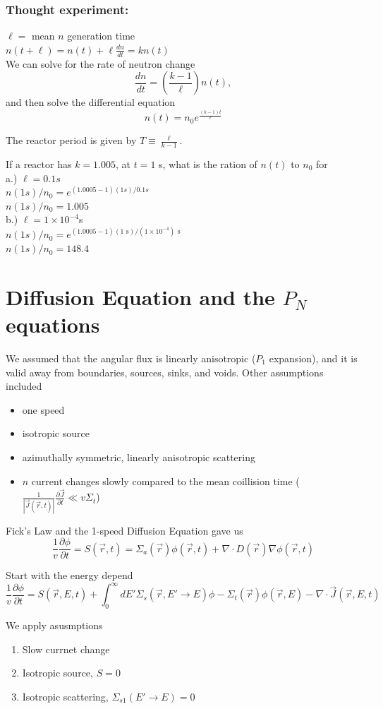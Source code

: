 \documentclass{report}
\newcommand{\tab}{\-\hspace{1cm}}
\newcommand{\h}[1]{\section*{#1}}
\newcommand{\hhh}[1]{\subsubsection*{#1}}
\newcommand{\p}{\partial}
\newcommand{\Xs}{\Sigma}
\newcommand{\Oov}{\frac{1}{v}}
\newcommand{\pos}{\vec{r}}
\newcommand{\cur}{\vec{J}}
\newcommand{\intzi}{\int_0^{\infty}}
\newcommand{\rt}{(\pos,t)}
\newcommand{\rE}{(\pos,E)}
\newcommand{\rEt}{(\pos,E,t)}
\begin{document}
\hhh{Thought experiment:}

$\ell =$ mean $n$ generation time\\
$ n(t+\ell) = n(t) + \ell\frac{dn}{dt} = kn(t)$\\

We can solve for the rate of neutron change\\
$$\frac{dn}{dt} = \left(\frac{k-1}{\ell}\right)n(t),$$
and then solve the differential equation
$$n(t) = n_0 e^{\frac{(k-1)t}{\ell}}$$

The reactor period is given by $T \equiv \frac{\ell}{k-1}$.

If a reactor has $k=1.005$, at $t=1$ s, what is the ration of $n(t)$ to $n_0$ for \\
a.) $\ell = 0.1s$\\
\tab $n(1s)/n_0 = e^{(1.0005-1)(1s)/0.1s}$\\
\tab $\boxed{ n(1s)/n_0 = 1.005 }$\\
b.) $\ell = 1 \times 10^{-4}$s\\
\tab $n(1s)/n_0 = e^{(1.0005-1)(1\text{ s})/(1\times10^{-4})\text{ s}}$\\
\tab $\boxed{ n(1s)/n_0 = 148.4 }$



\h{Diffusion Equation and the $P_N$ equations}

We assumed that the angular flux is linearly anisotropic ($P_1$ expansion), and it is valid away from boundaries, sources, sinks, and voids. Other assumptions included
\begin{itemize}
    \item one speed
    \item isotropic source
    \item azimuthally symmetric, linearly anisotropic scattering
    \item $n$ current changes slowly compared to the mean coillision time ($\frac{1}{|\cur\rt|} \frac{\p\cur}{\p t} \ll v \Xs_t$)
\end{itemize}

Fick's Law and the 1-speed Diffusion Equation gave us
$$ \Oov \frac{\p \phi}{\p t} = S\rt = \Xs_a(\pos)\phi\rt + \nabla \cdot D(\pos) \nabla\phi\rt $$

Start with the energy depend
$$ \Oov \frac{\p \phi}{\p t} = S\rEt + \intzi dE' \Xs_s(\pos,E' \rightarrow E)\phi - \Xs_t(\pos)\phi\rE - \nabla \cdot \cur\rEt$$

We apply asusmptions
\begin{enumerate}
    \item Slow currnet change
    \item Isotropic source, $S=0$
    \item Isotropic scattering, $\Xs_{s1}(E' \rightarrow E) = 0$
\end{enumerate}
\end{document}
